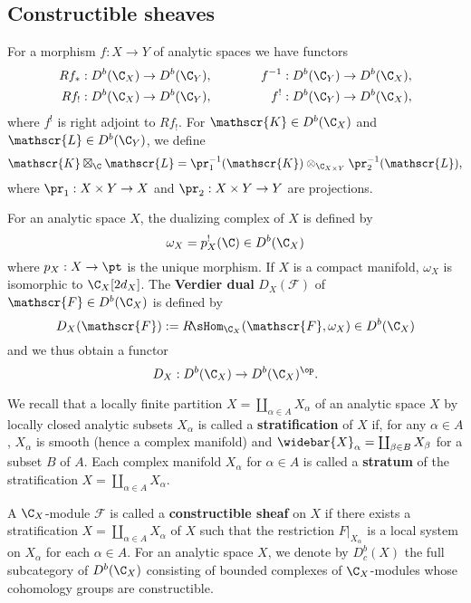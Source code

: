 \subsection{Constructible sheaves}
For a morphism $f:X\to Y$ of analytic spaces we have functors
\begin{alignat*}{3}
Rf_*&:D^b(\C_X)\to D^b(\C_Y),&\quad\quad&& f^{-1}&:D^b(\C_Y)\to D^b(\C_X),\\
Rf_!&:D^b(\C_X)\to D^b(\C_Y),&\quad\quad&& f^!&:D^b(\C_Y)\to D^b(\C_X),
\end{alignat*}
where $f^!$ is right adjoint to $Rf_!$. For $\mathscr{K}\in D^b(\C_X)$ and $\mathscr{L}\in D^b(\C_Y)$, we define
\[\mathscr{K}\boxtimes_\C\mathscr{L}=\pr_1^{-1}(\mathscr{K})\otimes_{\C_{X\times Y}}\pr_2^{-1}(\mathscr{L}),\]
where $\pr_1:X\times Y\to X$ and $\pr_2:X\times Y\to Y$ are projections.\par
For an analytic space $X$, the dualizing complex of $X$ is defined by
\[\omega_X=p_X^!(\C)\in D^b(\C_X)\] 
where $p_X:X\to\pt$ is the unique morphism. If $X$ is a compact manifold, $\omega_X$ is isomorphic to $\C_X[2d_X]$. The \textbf{Verdier dual} $D_X(\mathscr{F})$ of $\mathscr{F}\in D^b(\C_X)$ is defined by
\[D_X(\mathscr{F}):=R\!\sHom_{\C_X}(\mathscr{F},\omega_X)\in D^b(\C_X)\]
and we thus obtain a functor
\[D_X:D^b(\C_X)\to D^b(\C_X)^{\op}.\]

We recall that a locally finite partition $X=\coprod_{\alpha\in A}X_\alpha$ of an analytic space $X$ by locally closed analytic subsets $X_\alpha$ is called a \textbf{stratification} of $X$ if, for any $\alpha\in A$, $X_\alpha$ is smooth (hence a complex manifold) and $\widebar{X}_\alpha=\coprod_{\beta\in B}X_\beta$ for a subset $B$ of $A$. Each complex manifold $X_\alpha$ for $\alpha\in A$ is called a \textbf{stratum} of the stratification $X=\coprod_{\alpha\in A}X_\alpha$.\par
A $\C_X$-module $\mathscr{F}$ is called a \textbf{constructible sheaf} on $X$ if there exists a stratification $X=\coprod_{\alpha\in A}X_\alpha$ of $X$ such that the restriction $F|_{X_\alpha}$ is a local system on $X_\alpha$ for each $\alpha\in A$. For an analytic space $X$, we denote by $D^b_c(X)$ the full subcategory of $D^b(\C_X)$ consisting of bounded complexes of $\C_X$-modules whose cohomology groups are constructible.

